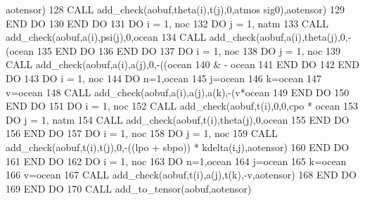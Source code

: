 \begin{DoxyCode}
      aotensor)
128           \textcolor{keyword}{CALL }add\_check(aobuf,theta(i),t(j),0,atmos%
      sig0),aotensor)
129 \textcolor{keywordflow}{       END DO}
130 \textcolor{keywordflow}{    END DO}
131     \textcolor{keywordflow}{DO} i = 1, noc
132        \textcolor{keywordflow}{DO} j = 1, natm
133           \textcolor{keyword}{CALL }add\_check(aobuf,a(i),psi(j),0,ocean%
134           \textcolor{keyword}{CALL }add\_check(aobuf,a(i),theta(j),0,-(ocean%
135 \textcolor{keywordflow}{       END DO}
136 \textcolor{keywordflow}{    END DO}
137     \textcolor{keywordflow}{DO} i = 1, noc
138        \textcolor{keywordflow}{DO} j = 1, noc
139           \textcolor{keyword}{CALL }add\_check(aobuf,a(i),a(j),0,-((ocean%
140                & - ocean%
141 \textcolor{keywordflow}{       END DO}
142 \textcolor{keywordflow}{    END DO}
143     \textcolor{keywordflow}{DO} i = 1, noc
144        \textcolor{keywordflow}{DO} n=1,ocean%
145           j=ocean%
146           k=ocean%
147           v=ocean%
148           \textcolor{keyword}{CALL }add\_check(aobuf,a(i),a(j),a(k),-(v*ocean%
149 \textcolor{keywordflow}{       END DO}
150 \textcolor{keywordflow}{    END DO}
151     \textcolor{keywordflow}{DO} i = 1, noc
152        \textcolor{keyword}{CALL }add\_check(aobuf,t(i),0,0,cpo * ocean%
153        \textcolor{keywordflow}{DO} j = 1, natm
154           \textcolor{keyword}{CALL }add\_check(aobuf,t(i),theta(j),0,ocean%
155 \textcolor{keywordflow}{       END DO}
156 \textcolor{keywordflow}{    END DO}
157     \textcolor{keywordflow}{DO} i = 1, noc
158        \textcolor{keywordflow}{DO} j = 1, noc
159           \textcolor{keyword}{CALL }add\_check(aobuf,t(i),t(j),0,-((lpo + sbpo)) * kdelta(i,j),aotensor)
160 \textcolor{keywordflow}{       END DO}
161 \textcolor{keywordflow}{    END DO}
162     \textcolor{keywordflow}{DO} i = 1, noc
163        \textcolor{keywordflow}{DO} n=1,ocean%
164           j=ocean%
165           k=ocean%
166           v=ocean%
167           \textcolor{keyword}{CALL }add\_check(aobuf,t(i),a(j),t(k),-v,aotensor)
168 \textcolor{keywordflow}{       END DO}
169 \textcolor{keywordflow}{    END DO}
170     \textcolor{keyword}{CALL }add\_to\_tensor(aobuf,aotensor)
\end{DoxyCode}
